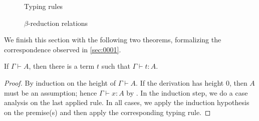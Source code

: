 \documentclass[a4paper]{article}
\begin{document}
\begin{figure}
  \centering
  \caption{Typing rules}
  \label{fig:0000}
\end{figure}

\begin{figure}
  \centering
  \caption{$\beta$-reduction relations}
  \label{fig:0001}
\end{figure}

We finish this section with the following two theorems, formalizing the correspondence observed in \cref{sec:0001}.

\begin{theorem}
  If $\Gamma \vdash A$, then there is a term $t$ such that $\Gamma \vdash t : A$.
\end{theorem}
\begin{proof}
  By induction on the height of $\Gamma \vdash A$.
  If the derivation has height 0, then $A$ must be an assumption; hence $\Gamma \vdash x : A$ by \rVar.
  In the induction step, we do a case analysis on the last applied rule.
  In all cases, we apply the induction hypothesis on the premise(s) and then apply the corresponding typing rule.
\end{proof}
\end{document}
